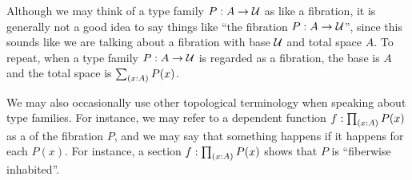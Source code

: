 \documentclass[hott-all.tex]{subfiles}
\begin{document}
\begin{rmk}
  Although we may think of a type family $P:A\to \mathcal{U}$ as like a fibration, it is generally not a good idea to say things like ``the fibration $P:A\to\mathcal{U}$'', since this sounds like we are talking about a fibration with base $\mathcal{U}$ and total space $A$.
  To repeat, when a type family $P:A\to \mathcal{U}$ is regarded as a fibration, the base is $A$ and the total space is $\sm{x:A} P(x)$.

  We may also occasionally use other topological terminology when speaking about type families.
  For instance, we may refer to a dependent function $f:\prd{x:A} P(x)$ as a 
  of the fibration $P$, and we may say that something happens 
  if it happens for each $P(x)$.
  For instance, a section $f:\prd{x:A} P(x)$ shows that $P$ is ``fiberwise inhabited''.
\end{rmk}
%
%
%
\end{document}
